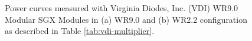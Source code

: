 \begin{figure}[!htb]
    \hfill
    \hfill

    \caption{Power curves measured with Virginia Diodes, Inc. (VDI) WR9.0 Modular SGX Modules in (a) WR9.0 and (b) WR2.2 configuration as described in Table \ref{tab:vdi-multiplier}.}
    \label{fig:power-curves}
\end{figure}

